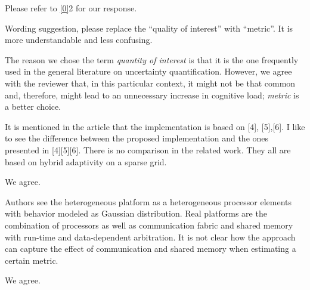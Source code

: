 \begin{authors}
Please refer to \cref{0}{2} for our response.
\end{authors}

\begin{reviewer}
Wording suggestion, please replace the ``quality of interest'' with ``metric''.
It is more understandable and less confusing.
\end{reviewer}

\begin{authors}
The reason we chose the term \emph{quantity of interest} is that it is the one
frequently used in the general literature on uncertainty quantification.
However, we agree with the reviewer that, in this particular context, it might
not be that common and, therefore, might lead to an unnecessary increase in
cognitive load; \emph{metric} is a better choice.

\begin{actions}
\end{actions}
\end{authors}

\begin{reviewer}
It is mentioned in the article that the implementation is  based on [4],
[5],[6]. I like to see the difference between the proposed implementation and
the ones presented in [4][5][6]. There is no comparison in the related work.
They all are based on hybrid adaptivity on a sparse grid.
\end{reviewer}

\begin{authors}
We agree.

\begin{actions}
\end{actions}
\end{authors}

\begin{reviewer}
Authors see the heterogeneous platform as a heterogeneous processor elements
with behavior modeled as Gaussian distribution. Real platforms are the
combination of processors as well as communication fabric and shared memory with
run-time and data-dependent arbitration. It is not clear how the approach can
capture the effect of communication and shared memory when estimating a certain
metric.
\end{reviewer}

\begin{authors}
We agree.

\begin{actions}
\end{actions}
\end{authors}
